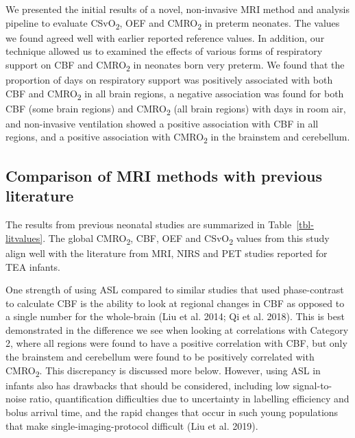 \documentclass[
  letterpaper,
  DIV=11,
  numbers=noendperiod]{scrartcl}
\begin{document}
We presented the initial results of a novel, non-invasive MRI method and
analysis pipeline to evaluate CSvO\textsubscript{2}, OEF and
CMRO\textsubscript{2} in preterm neonates. The values we found agreed
well with earlier reported reference values. In addition, our technique
allowed us to examined the effects of various forms of respiratory
support on CBF and CMRO\textsubscript{2} in neonates born very preterm.
We found that the proportion of days on respiratory support was
positively associated with both CBF and CMRO\textsubscript{2} in all
brain regions, a negative association was found for both CBF (some brain
regions) and CMRO\textsubscript{2} (all brain regions) with days in room
air, and non-invasive ventilation showed a positive association with CBF
in all regions, and a positive association with CMRO\textsubscript{2} in
the brainstem and cerebellum.

\subsection{Comparison of MRI methods with previous
literature}\label{comparison-of-mri-methods-with-previous-literature}

The results from previous neonatal studies are summarized in
Table~\ref{tbl-litvalues}. The global CMRO\textsubscript{2}, CBF, OEF
and CSvO\textsubscript{2} values from this study align well with the
literature from MRI, NIRS and PET studies reported for TEA infants.

One strength of using ASL compared to similar studies that used
phase-contrast to calculate CBF is the ability to look at regional
changes in CBF as opposed to a single number for the whole-brain (Liu et
al. 2014; Qi et al. 2018). This is best demonstrated in the difference
we see when looking at correlations with Category 2, where all regions
were found to have a positive correlation with CBF, but only the
brainstem and cerebellum were found to be positively correlated with
CMRO\textsubscript{2}. This discrepancy is discussed more below.
However, using ASL in infants also has drawbacks that should be
considered, including low signal-to-noise ratio, quantification
difficulties due to uncertainty in labelling efficiency and bolus
arrival time, and the rapid changes that occur in such young populations
that make single-imaging-protocol difficult (Liu et al. 2019).
\end{document}
